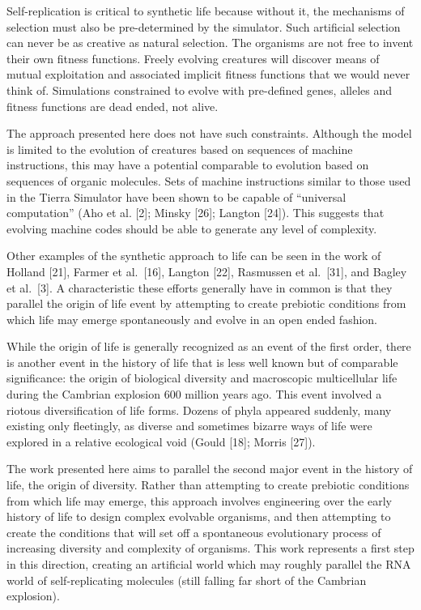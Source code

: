 Self-replication is critical to synthetic life because without it, the
mechanisms of selection must also be pre-determined by the simulator.  Such
artificial selection can never be as creative as natural selection.  The
organisms are not free to invent their own fitness functions.  Freely
evolving creatures will discover means of mutual exploitation and
associated implicit fitness functions that we would never think of.
Simulations constrained to evolve with pre-defined genes, alleles and fitness
functions are dead ended, not alive.

The approach presented here does not have such constraints.  Although the
model is limited to the evolution of creatures based on sequences of machine
instructions, this may have a potential comparable to evolution based on
sequences of organic molecules.  Sets of machine instructions similar to
those used in the Tierra Simulator have been shown to be capable of
``universal computation'' (Aho et al. [2]; Minsky [26]; Langton [24]).
This suggests that evolving machine codes should be able to generate any
level of complexity.

Other examples of the synthetic approach to life can be seen in the work of
Holland [21], Farmer et al.\ [16], Langton [22], Rasmussen et al.\
[31], and Bagley et al.\ [3].  A characteristic these efforts
generally have in common is that they parallel the origin of life event by
attempting to create prebiotic conditions from which life may emerge
spontaneously and evolve in an open ended fashion.

While the origin of life is generally recognized as an event of the first
order, there is another event in the history of life that is less well known
but of comparable significance: the origin of biological diversity and
macroscopic multicellular life during the Cambrian explosion 600 million
years ago.  This event involved a riotous diversification of life forms.
Dozens of phyla appeared suddenly, many existing only fleetingly, as
diverse and sometimes bizarre ways of life were explored in a relative
ecological void (Gould [18]; Morris [27]).

The work presented here aims to parallel the second major event in the
history of life, the origin of diversity.  Rather than attempting to create
prebiotic conditions from which life may emerge, this approach involves
engineering over the early history of life to design complex evolvable
organisms, and then attempting to create the conditions that will set off
a spontaneous evolutionary process of increasing diversity and complexity
of organisms.  This work represents a first step in this direction, creating
an artificial world which may roughly parallel the RNA world of
self-replicating molecules (still falling far short of the Cambrian explosion).

